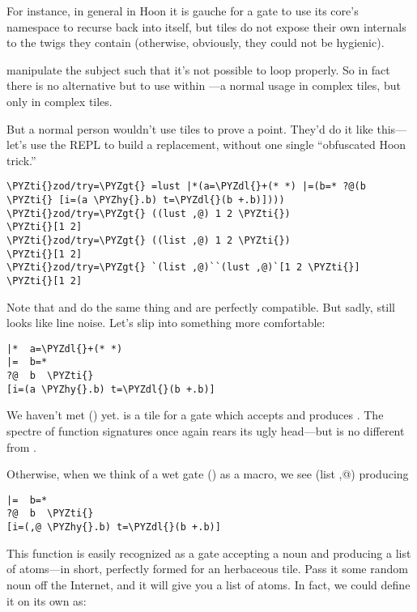 For instance, in general in Hoon it is gauche for a gate to use
its core's namespace to recurse back into itself, but tiles do
not expose their own internals to the twigs they contain
(otherwise, obviously, they could not be hygienic).

manipulate the subject such that it's not possible to loop
properly.  So in fact there is no alternative but to use  within ---a normal usage in complex tiles, but only
in complex tiles.

But a normal person wouldn't use tiles to prove a point.  They'd
do it like this---let's use the REPL to build a  replacement, 
without one single ``obfuscated Hoon trick.''

\begin{framed_shaded}
\begin{Verbatim}[fontsize=\relsize{-2.5},fontseries=b,commandchars=\\\{\}]
\PYZti{}zod/try=\PYZgt{} =lust |*(a=\PYZdl{}+(* *) |=(b=* ?@(b \PYZti{} [i=(a \PYZhy{}.b) t=\PYZdl{}(b +.b)])))
\PYZti{}zod/try=\PYZgt{} ((lust ,@) 1 2 \PYZti{})
\PYZti{}[1 2]
\PYZti{}zod/try=\PYZgt{} ((list ,@) 1 2 \PYZti{})
\PYZti{}[1 2]
\PYZti{}zod/try=\PYZgt{} `(list ,@)``(lust ,@)`[1 2 \PYZti{}]
\PYZti{}[1 2]
\end{Verbatim}
\end{framed_shaded}
Note that  and  do the same thing and are perfectly
compatible.  But sadly,  still looks like line noise.
Let's slip into something more comfortable:

\begin{framed_shaded}
\begin{Verbatim}[fontsize=\relsize{-2.5},fontseries=b,commandchars=\\\{\}]
|*  a=\PYZdl{}+(* *)
|=  b=*
?@  b  \PYZti{}
[i=(a \PYZhy{}.b) t=\PYZdl{}(b +.b)]
\end{Verbatim}
\end{framed_shaded}
We haven't met \kode{\$+} () yet.   is a tile for a
gate which accepts  and produces .  The spectre of function
signatures once again rears its ugly head---but  is no
different from .

Otherwise, when we think of a wet gate (\kode{\textbar{}*}) as a macro, we see
(list ,@) producing

\begin{framed_shaded}
\begin{Verbatim}[fontsize=\relsize{-2.5},fontseries=b,commandchars=\\\{\}]
|=  b=*
?@  b  \PYZti{}
[i=(,@ \PYZhy{}.b) t=\PYZdl{}(b +.b)]
\end{Verbatim}
\end{framed_shaded}
This function is easily recognized as a gate accepting a noun and
producing a list of atoms---in short, perfectly formed for an
herbaceous tile.  Pass it some random noun off the Internet, and
it will give you a list of atoms.  In fact, we could define it
on its own as:

